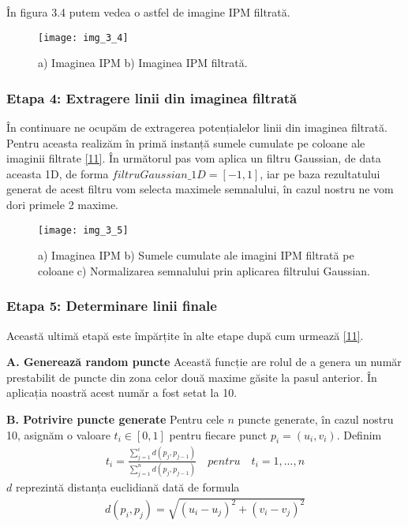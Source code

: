 În figura 3.4 putem vedea o astfel de imagine IPM filtrată.
\begin{figure}[!h]
	\centering
	\texttt{[image: img\_3\_4]}
	\caption[Imagine IPM filtrată]{a) Imaginea IPM b) Imaginea IPM filtrată.}
\end{figure}

\subsubsection*{Etapa 4: Extragere linii din imaginea filtrată}

În continuare ne ocupăm de extragerea potențialelor linii din imaginea filtrată. Pentru aceasta realizăm în primă instanță sumele cumulate pe coloane ale imaginii filtrate \hyperlink{WaymoSystem}{[11]}. În următorul pas vom aplica un filtru Gaussian, de data aceasta 1D, de forma $filtruGaussian\_1D = [-1, 1]$, iar pe baza rezultatului generat de acest filtru vom selecta maximele semnalului, în cazul nostru ne vom dori primele 2 maxime.

\begin{figure}[!h]
	\centering
	\texttt{[image: img\_3\_5]}
	\caption[Linii din semnal]{a) Imaginea IPM b) Sumele cumulate ale imagini IPM filtrată pe coloane c) Normalizarea semnalului prin aplicarea filtrului Gaussian.}
\end{figure}

\subsubsection*{Etapa 5: Determinare linii finale}

Această ultimă etapă este împărțite în alte etape după cum urmează \hyperlink{WaymoSystem}{[11]}.

\textbf{A. Generează random puncte}
Această funcție are rolul de a genera un număr prestabilit de puncte din zona celor două maxime găsite la pasul anterior. În aplicația noastră acest număr a fost setat la 10.

\textbf{B. Potrivire puncte generate}
Pentru cele $n$ puncte generate, în cazul nostru 10, asignăm o valoare $t_i \in [0, 1]$ pentru fiecare punct $p_i = (u_i, v_i)$. Definim
\begin{align}
	t_i = \frac{\sum_{j = 1}^{i} d(p_j,p_{j-1})}{\sum_{j = 1}^{n} d(p_j,p_{j-1})} \quad pentru \quad t_i = 1, ..., n
\end{align}
$d$ reprezintă distanța euclidiană dată de formula
\begin{align}
	d(p_i,p_j) = \sqrt{(u_i - u_j)^2 + (v_i - v_j)^2}
\end{align}

